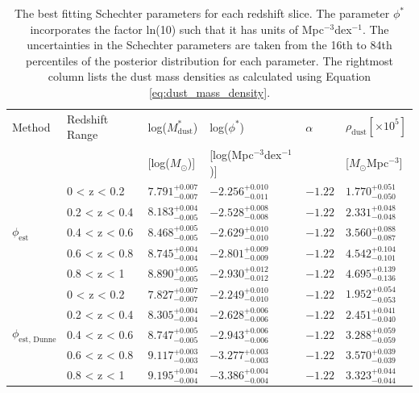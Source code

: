 \begin{table}
    \centering
    \begin{tabular}{p{2cm}|p{2.5cm}|p{2cm}|p{3cm}|p{1.5cm}|p{2cm}}
        \hline
        \hline
        Method & Redshift Range & log($M_{\textrm{dust}}^*$) & log($\phi^*$) & $\alpha$ & $\rho_{\textrm{dust}} [\times10^5]$ \\
        & & [log($M_{\odot}$)] & [log(Mpc$^{-3}$dex$^{-1}$)] & & [$M_{\odot}$Mpc$^{-3}$] \\
        \hline
        \hline
        \multirow{5}{*}{$\phi_{\textrm{est}}$} & 0 < z < 0.2 & $7.791^{+0.007}_{-0.007}$ & $-2.256^{+0.010}_{-0.011}$ & $-1.22$ & $1.770^{+0.051}_{-0.050}$ \\
        & 0.2 < z < 0.4 & $8.183^{+0.004}_{-0.005}$ & $-2.528^{+0.008}_{-0.008}$ & $-1.22$ & $2.331^{+0.048}_{-0.048}$ \\
        & 0.4 < z < 0.6 & $8.468^{+0.005}_{-0.005}$ & $-2.629^{+0.010}_{-0.010}$ & $-1.22$ & $3.560^{+0.088}_{-0.087}$ \\
        & 0.6 < z < 0.8 & $8.745^{+0.004}_{-0.004}$ & $-2.801^{+0.009}_{-0.009}$ & $-1.22$ & $4.542^{+0.104}_{-0.101}$ \\
        & 0.8 < z < 1 & $8.890^{+0.005}_{-0.005}$ & $-2.930^{+0.012}_{-0.012}$ & $-1.22$ & $4.695^{+0.139}_{-0.136}$ \\
        \hline
        \multirow{5}{*}{$\phi_{\textrm{est, Dunne}}$} & 0 < z < 0.2 & $7.827^{+0.007}_{-0.007}$ & $-2.249^{+0.010}_{-0.010}$ & $-1.22$ & $1.952^{+0.054}_{-0.053}$ \\
        & 0.2 < z < 0.4 & $8.305^{+0.004}_{-0.004}$ & $-2.628^{+0.006}_{-0.006}$ & $-1.22$ & $2.451^{+0.041}_{-0.040}$ \\
        & 0.4 < z < 0.6 & $8.747^{+0.005}_{-0.005}$ & $-2.943^{+0.006}_{-0.006}$ & $-1.22$ & $3.288^{+0.059}_{-0.059}$ \\
        & 0.6 < z < 0.8 & $9.117^{+0.003}_{-0.003}$ & $-3.277^{+0.003}_{-0.003}$ & $-1.22$ & $3.570^{+0.039}_{-0.039}$ \\
        & 0.8 < z < 1 & $9.195^{+0.004}_{-0.004}$ & $-3.386^{+0.004}_{-0.004}$ & $-1.22$ & $3.323^{+0.044}_{-0.044}$ \\
        \hline
    \end{tabular}
    \caption[Best fitting Schechter parameters of our SGP DMFs in each redshift slice]{The best fitting Schechter parameters for each redshift slice. The parameter $\phi^*$ incorporates the factor \textrm{ln}(10) such that it has units of Mpc$^{-3}$dex$^{-1}$. The uncertainties in the Schechter parameters are taken from the 16th to 84th percentiles of the posterior distribution for each parameter. The rightmost column lists the dust mass densities as calculated using Equation \ref{eq:dust_mass_density}.}
    \label{tab:schechter_parameters}
\end{table}

